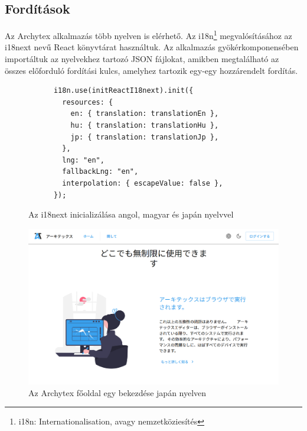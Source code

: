 \subsection{Fordítások}
Az Archytex alkalmazás több nyelven is elérhető. Az i18n\footnote{i18n: Internationalisation, avagy nemzetköziesítés}  megvalósításához az i18next nevű React könyvtárat használtuk. Az alkalmazás gyökérkomponensében importáltuk az nyelvekhez tartozó JSON fájlokat, amikben megtalálható az összes előforduló fordítási kulcs, amelyhez tartozik egy-egy hozzárendelt fordítás.

\begin{figure}[H]
  \centering
  \begin{minipage}{.7\textwidth}
    \centering
    \begin{lstlisting}
      i18n.use(initReactI18next).init({
        resources: {
          en: { translation: translationEn },
          hu: { translation: translationHu },
          jp: { translation: translationJp },
        },
        lng: "en",
        fallbackLng: "en",
        interpolation: { escapeValue: false },
      });\end{lstlisting}
  \end{minipage}
  \caption{Az i18next inicializálása angol, magyar és japán nyelvvel}
\end{figure}

\begin{figure}[H]
  \centering
  \includegraphics[width=.6\textwidth]{parts/developer-documentation/frontend/images/translated.png}
  \caption{Az Archytex főoldal egy bekezdése japán nyelven}
\end{figure}
